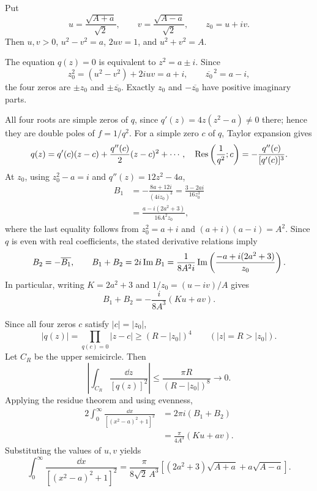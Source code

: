 \documentclass[11pt,oneside]{article}
\begin{document}
\begin{solution}
Put
\[
    u=\frac{\sqrt{A+a}}{\sqrt2},\qquad
    v=\frac{\sqrt{A-a}}{\sqrt2},\qquad z_0=u+iv.
\]
Then $u,v>0$, $u^2-v^2=a$, $2uv=1$, and $u^2+v^2=A$.
\begin{exercisesubparts}
    \item The equation $q(z)=0$ is equivalent to $z^2=a\pm i$. Since
    \[
        z_0^2=(u^2-v^2)+2iuv=a+i,
        \qquad\overline{z_0}^{\,2}=a-i,
    \]
    the four zeros are $\pm z_0$ and $\pm\overline{z_0}$. Exactly $z_0$ and $-\overline{z_0}$ have positive imaginary parts.

    \item All four roots are simple zeros of $q$, since $q'(z)=4z(z^2-a)\ne0$ there; hence they are double poles of $f=1/q^2$. For a simple zero $c$ of $q$, Taylor expansion gives
    \[
        q(z)=q'(c)(z-c)+\frac{q''(c)}2(z-c)^2+\cdots,
        \quad
        \operatorname{Res}\left(\frac1{q^2};c\right)
          =-\frac{q''(c)}{[q'(c)]^3}.
    \]
    At $z_0$, using $z_0^2-a=i$ and $q''(z)=12z^2-4a$,
    \[
    \begin{aligned}
        B_1&=-\frac{8a+12i}{(4iz_0)^3}
             =\frac{3-2ai}{16z_0^3}\\
           &=\frac{a-i(2a^2+3)}{16A^2z_0},
    \end{aligned}
    \]
    where the last equality follows from $z_0^2=a+i$ and $(a+i)(a-i)=A^2$. Since $q$ is even with real coefficients, the stated derivative relations imply
    \[
        B_2=-\overline{B_1},\qquad
        B_1+B_2=2i\operatorname{Im} B_1
          =\frac1{8A^2i}\operatorname{Im}\left(\frac{-a+i(2a^2+3)}{z_0}\right).
    \]
    In particular, writing $K=2a^2+3$ and $1/z_0=(u-iv)/A$ gives
    \[
        B_1+B_2=-\frac{i}{8A^3}(Ku+av).
    \]

    \item Since all four zeros $c$ satisfy $|c|=|z_0|$,
    \[
        |q(z)|=\prod_{q(c)=0}|z-c|
        \ge(R-|z_0|)^4\qquad(|z|=R>|z_0|).
    \]
    Let $C_R$ be the upper semicircle. Then
    \[
        \left|\int_{C_R}\frac{\dd z}{[q(z)]^2}\right|
        \le\frac{\pi R}{(R-|z_0|)^8}\longrightarrow0.
    \]
    Applying the residue theorem and using evenness,
    \[
    \begin{aligned}
        2\int_0^\infty\frac{\dd x}{[(x^2-a)^2+1]^2}
        &=2\pi i(B_1+B_2)\\
        &=\frac{\pi}{4A^3}(Ku+av).
    \end{aligned}
    \]
    Substituting the values of $u,v$ yields
    \[
        \boxed{\int_0^\infty\frac{\dd x}{[(x^2-a)^2+1]^2}
        =\frac{\pi}{8\sqrt2\,A^3}
          \left[(2a^2+3)\sqrt{A+a}+a\sqrt{A-a}\right].}
    \]
\end{exercisesubparts}
\end{solution}
\end{document}
